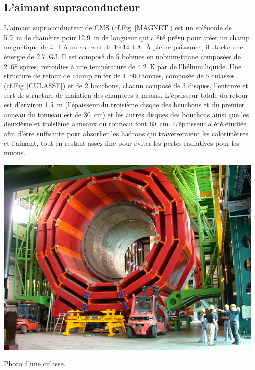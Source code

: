\subsection{L'aimant supraconducteur}
\vspace*{-0.3cm}
L'aimant supraconducteur de CMS (cf.Fig~\ref{MAGNET}) est un solénoïde de \SI{5.9}{\meter} de diamètre pour \SI{12.9}{\meter} de longueur qui a été prévu pour créer un champ magnétique de \SI{4}{\tesla} à un courant de \SI{19.14}{\kilo\ampere}. À pleine puissance, il stocke une énergie de \SI{2.7}{\giga\joule}. Il est composé de \num{5} bobines en nobium-titane composées de \num{2168} spires, refroidies à une température de \SI{4.2}{\kelvin} par de l'hélium liquide. Une structure de retour de champ en fer de \num{11500} tonnes, composée de \num{5} culasses (cf.Fig~\ref{CULASSE}) et de \num{2} bouchons, chacun composé de \num{3} disques, l'entoure et sert de structure de maintien des chambres à muons. L'épaisseur totale du retour est d'environ \SI{1.5}{\meter} (l'épaisseur du troisième disque des bouchons et du premier anneau du tonneau est de \SI{30}{\centi\meter}) et les autres disques des bouchons ainsi que les deuxième et troisième anneaux du tonneau font \SI{60}{\centi\meter}. L'épaisseur a été étudiée afin d'être suffisante pour absorber les hadrons qui traverseraient les calorimètres et l'aimant, tout en restant assez fine pour éviter les pertes radiatives pour les muons.
\marginpar
{
	\centering
	\includegraphics[width=\marginparwidth]{CMS/CULASSE.jpg}
	\captionsetup{type=figure}\caption{Photo d'une culasse.}
	\label{CULASSE}
}
